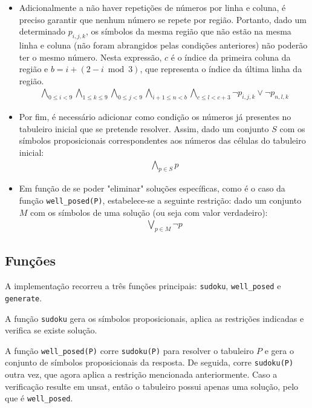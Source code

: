 \documentclass[a4paper,12pt]{article}
\theoremstyle{definition}
\theoremstyle{theorem}
\theoremstyle{remark}
\newcommand{\code}[1]{\texttt{#1}}
\begin{document}
\begin{itemize}
     \item Adicionalmente a não haver repetições de números por linha e coluna,
        é preciso garantir que nenhum número se repete por região. Portanto,
        dado um determinado $p_{i,j,k}$,
        os símbolos da mesma região que não estão na mesma linha e coluna
        (não foram abrangidos pelas condições anteriores) não poderão ter o
        mesmo número. Nesta expressão, $c$ é o índice da primeira coluna da
        região e $b = i+(2 - i \bmod 3)$, que representa o índice da última
        linha da região.
     \begin{align}
        \bigwedge_{0\leq i < 9}
        \bigwedge_{1\leq k \leq 9}
        \bigwedge_{0\leq j < 9}
        \bigwedge_{i + 1 \leq n < b}
        \bigwedge_{c\leq l < c+3} \lnot p_{i,j,k} \lor \lnot p_{n,l,k}
     \end{align}
     
     \item Por fim, é necessário adicionar como condição os números já
        presentes no tabuleiro inicial que se pretende resolver. Assim, dado um
        conjunto $S$ com os símbolos proposicionais correspondentes aos números
        das células do tabuleiro inicial: 
        \begin{align}
        \bigwedge_{p\in S} p
        \end{align}
     
     \item Em função de se poder "eliminar" soluções específicas, como é o
        caso da função \texttt{well\_posed(P)}, estabelece-se a seguinte
        restrição: dado um conjunto $M$ com os símbolos de uma solução (ou seja
        com valor verdadeiro):
     \begin{align}
     \bigvee_{p\in M} \lnot p
     \end{align}
\end{itemize}

\subsection{Funções}
A implementação recorreu a três funções principais: \code{sudoku},
\code{well\_posed} e \code{generate}.

A função \code{sudoku} gera os símbolos proposicionais, aplica as restrições
indicadas e verifica se existe solução.

A função \code{well\_posed(P)} corre \code{sudoku(P)} para resolver o tabuleiro
$P$ e gera o conjunto de símbolos proposicionais da resposta. De seguida, corre
\code{sudoku(P)} outra vez, que agora aplica a restrição mencionada anteriormente.
Caso a verificação resulte em unsat, então o tabuleiro possui apenas uma solução,
pelo que é \code{well\_posed}.
\end{document}
